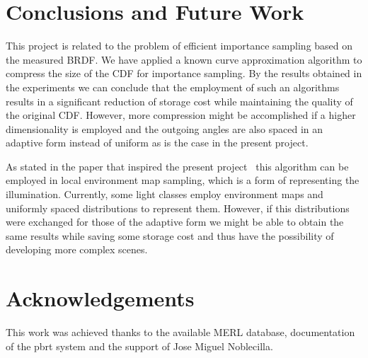 \documentclass[conference]{acmsiggraph}
\begin{document}
\section{Conclusions and Future Work}
This project is related to the problem of efficient importance sampling based on the measured BRDF. We have applied a known curve approximation algorithm to compress the size of the CDF for importance sampling. By the results obtained in the experiments we can conclude that the employment of such an algorithms results in a significant reduction of storage cost while maintaining the quality of the original CDF. However, more compression might be accomplished if a higher dimensionality is employed and the outgoing angles are also spaced in an adaptive form instead of uniform as is the case in the present project.

As stated in the paper that inspired the present project~\cite{Lawrence:2005:ANC} this algorithm can be employed in local environment map sampling, which is a form of representing the illumination. Currently, some light classes employ environment maps and uniformly spaced distributions to represent them. However, if this distributions were exchanged for those of the adaptive form we might be able to obtain the same results while saving some storage cost and thus have the possibility of developing more complex scenes.

\section*{Acknowledgements}

This work was achieved thanks to the available MERL database, documentation of the pbrt system and the support of Jose Miguel Noblecilla.  



\end{document}

